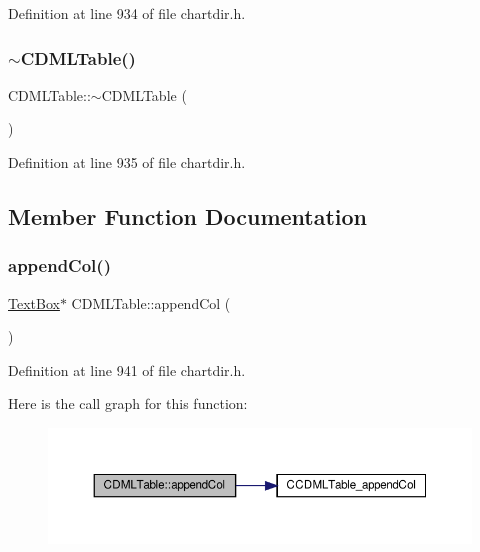 Definition at line 934 of file chartdir.\+h.

\mbox{\label{class_c_d_m_l_table_a1d115374895e7594e70e25b45816c29d}} 
\subsubsection{\texorpdfstring{$\sim$\+C\+D\+M\+L\+Table()}{~CDMLTable()}}
{\footnotesize\ttfamily C\+D\+M\+L\+Table\+::$\sim$\+C\+D\+M\+L\+Table (\begin{DoxyParamCaption}{ }\end{DoxyParamCaption})\hspace{0.3cm}{\ttfamily [inline]}}



Definition at line 935 of file chartdir.\+h.



\subsection{Member Function Documentation}
\mbox{\label{class_c_d_m_l_table_ab81a2b5f80d3feac37249426a12fdabf}} 
\subsubsection{\texorpdfstring{append\+Col()}{appendCol()}}
{\footnotesize\ttfamily \hyperlink{class_text_box}{Text\+Box}$\ast$ C\+D\+M\+L\+Table\+::append\+Col (\begin{DoxyParamCaption}{ }\end{DoxyParamCaption})\hspace{0.3cm}{\ttfamily [inline]}}



Definition at line 941 of file chartdir.\+h.

Here is the call graph for this function\+:
\nopagebreak
\begin{figure}[H]
\begin{center}
\leavevmode
\includegraphics[width=350pt]{class_c_d_m_l_table_ab81a2b5f80d3feac37249426a12fdabf_cgraph}
\end{center}
\end{figure}
\mbox{\label{class_c_d_m_l_table_a1ce86017996573f4c00571e59be500e1}} 
